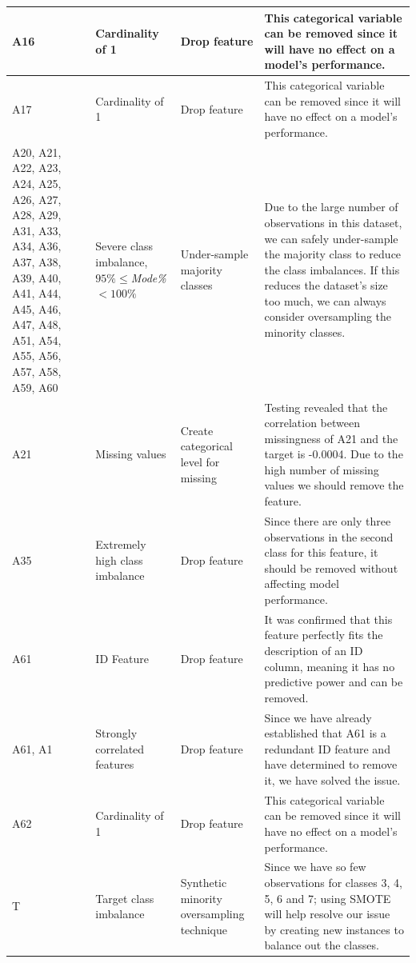 \documentclass[11pt]{article}
\begin{document}
\begin{longtable}{|p{1.7cm}|p{4cm}|p{3cm}|p{6cm}|}
	A16 & Cardinality of 1 & Drop feature & This categorical variable can be removed since it will have no effect on a model's performance. \\ \hline
	A17 & Cardinality of 1 & Drop feature & This categorical variable can be removed since it will have no effect on a model's performance. \\ \hline
	A20, A21, A22, A23, A24, A25, A26, A27, A28, A29, A31, A33, A34, A36, A37, A38, A39, A40, A41, A44, A45, A46, A47, A48, A51, A54, A55, A56, A57, A58, A59, A60 & Severe class imbalance, $95\%\le$\textit{Mode\%} $< 100\%$ & Under-sample majority classes & Due to the large number of observations in this dataset, we can safely under-sample the majority class to reduce the class imbalances. If this reduces the dataset's size too much, we can always consider oversampling the minority classes. \\ \hline
	A21 & Missing values & Create categorical level for missing & Testing revealed that the correlation between missingness of A21 and the target is -0.0004. Due to the high number of missing values we should remove the feature. \\ \hline
	A35 & Extremely high class imbalance & Drop feature & Since there are only three observations in the second class for this feature, it should be removed without affecting model performance. \\ \hline
	A61 & ID Feature & Drop feature & It was confirmed that this feature perfectly fits the description of an ID column, meaning it has no predictive power and can be removed. \\ \hline
	A61, A1 & Strongly correlated features & Drop feature & Since we have already established that A61 is a redundant ID feature and have determined to remove it, we have solved the issue. \\ \hline
	A62 & Cardinality of 1 & Drop feature & This categorical variable can be removed since it will have no effect on a model's performance. \\ \hline
	T & Target class imbalance & Synthetic minority oversampling technique & Since we have so few observations for classes 3, 4, 5, 6 and 7; using SMOTE will help resolve our issue by creating new instances to balance out the classes.  \\ \hline
\end{longtable}
\end{document}
